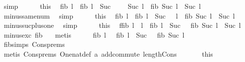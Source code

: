 \begin{isabellebody}
\ simp\isanewline
\ \ \ \ \isamarkupfalse%
\ this\ \isamarkupfalse%
\ {\isachardoublequoteopen}fib{}\ l\ {\isacharplus}\ fib{}\ {\isacharparenleft}l\ {\isacharminus}\ Suc\ {}{\isacharparenright}\ {\isacharplus}\ {}\ {\isacharminus}\ Suc\ l\ {\isacharequal}\ fib{}\ {\isacharparenleft}Suc\ l{\isacharparenright}\ {\isacharminus}\ Suc\ l{\isachardoublequoteclose}\ \isamarkupfalse%
\ minus{\isacharunderscore}same{\isacharunderscore}num\ \isamarkupfalse%
\ simp\isanewline
\ \ \ \ \isamarkupfalse%
\ this\ \isamarkupfalse%
\ {\isachardoublequoteopen}fib{}\ l\ {\isacharplus}\ fib{}\ {\isacharparenleft}l\ {\isacharminus}\ Suc\ {}{\isacharparenright}\ {\isacharminus}\ l\ {\isacharequal}\ fib{}\ {\isacharparenleft}Suc\ l{\isacharparenright}\ {\isacharminus}\ Suc\ l{\isachardoublequoteclose}\ \isamarkupfalse%
\ minus{\isacharunderscore}suc{\isacharunderscore}plus{\isacharunderscore}one\ \isamarkupfalse%
\ simp\isanewline
\ \ \ \ \isamarkupfalse%
\ this\ \isamarkupfalse%
\ f{}{\isacharcolon}{\isachardoublequoteopen}fib{}\ l\ {\isacharminus}\ l\ {\isacharplus}\ fib{}\ {\isacharparenleft}l\ {\isacharminus}\ Suc\ {}{\isacharparenright}\ {\isacharequal}\ fib{}\ {\isacharparenleft}Suc\ l{\isacharparenright}\ {\isacharminus}\ Suc\ l{\isachardoublequoteclose}\ \isamarkupfalse%
\ minus{\isacharunderscore}exc\ fib{}{\isacharunderscore}{}\ \ \isamarkupfalse%
\ metis\isanewline
\ \ \ \ \isamarkupfalse%
\ {\isachardoublequoteopen}fib\ l\ {\isacharplus}\ \ fib\ {\isacharparenleft}l\ {\isacharminus}\ Suc\ {}{\isacharparenright}\ {\isacharequal}\ fib\ {\isacharparenleft}Suc\ l{\isacharparenright}{\isachardoublequoteclose}\ \isamarkupfalse%
\ fib{\isachardot}simps{\isacharparenleft}{}{\isacharparenright}\ Cons{\isachardot}prems{\isacharparenleft}{}{\isacharparenright}\ \isamarkupfalse%
\ {\isacharparenleft}metis\ Cons{\isachardot}prems{\isacharparenleft}{}{\isacharparenright}\ One{\isacharunderscore}nat{\isacharunderscore}def\ a{}\ add{\isachardot}commute\ length{\isacharunderscore}Cons{\isacharparenright}\ \isanewline
\ \ \ \ \isamarkupfalse%
\ this\ \isamarkupfalse%

\end{isabellebody}
